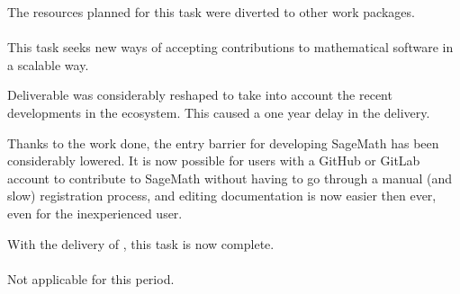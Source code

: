   The resources planned for this task were diverted to other work
  packages.
  
  \paragraph{}
  This task seeks new ways of accepting contributions to mathematical
  software in a scalable way.

  Deliverable  was
  considerably reshaped to take into account the recent developments
  in the ecosystem. This caused a one year delay in the delivery.

  Thanks to the work done, the entry barrier for developing SageMath
  has been considerably lowered. It is now possible for users with a
  GitHub or GitLab account to contribute to SageMath without having to
  go through a manual (and slow) registration process, and editing
  documentation is now easier then ever, even for the inexperienced
  user.

  With the delivery of
  , this task is now
  complete.

  \paragraph{}
  \label{component-architecture@oommf-python-interface}
  Not applicable for this period.

  


